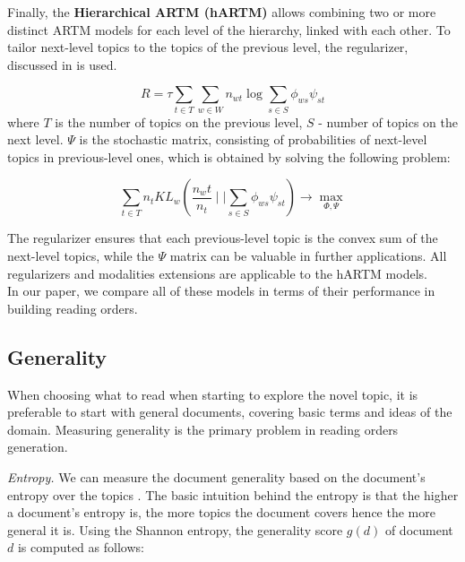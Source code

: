 \documentclass[12pt,twoside]{article}
\begin{document}
        Finally, the \textbf{Hierarchical ARTM (hARTM)} allows combining two or more distinct ARTM models for each level of the hierarchy, linked with each other. To tailor next-level topics to the topics of the previous level, the regularizer, discussed in \cite{chirkova16hier} is used. 
        
        \begin{equation}
            R = \tau \sum\limits_{t \in T}\sum\limits_{w \in W} n_{wt} \log \sum\limits_{s \in S} \phi_{ws}\psi_{st}
        \end{equation}
        where $T$ is the number of topics on the previous level, $S$ - number of topics on the next level. $\Psi$ is the stochastic matrix, consisting of probabilities of next-level topics in previous-level ones, which is obtained by solving the following problem:  
    
        \begin{equation}
            \sum\limits_{t \in T} n_t KL_w\left( \frac{n_wt}{n_t} \mid\mid \sum\limits_{s \in S} \phi_{ws} \psi_{st} \right) \rightarrow \max_{\Phi, \Psi}
        \end{equation}
        
        The regularizer ensures that each previous-level topic is the convex sum of the next-level topics, while the $\Psi$ matrix can be valuable in further applications. All regularizers and modalities extensions are applicable to the hARTM models. \\
        
        In our paper, we compare all of these models in terms of their performance in building reading orders.
	
	\subsection{Generality}
	
	When choosing what to read when starting to explore the novel topic, it is preferable to start with general documents, covering basic terms and ideas of the domain. Measuring generality is the primary problem in reading orders generation.
	
	\textit{Entropy.} We can measure the document generality based on the document’s entropy over the topics \cite{conf/icde/KoutrikaLS15}. The basic intuition behind the entropy is that the higher a document’s entropy is, the more topics the document covers hence the more general it is. Using the Shannon entropy, the generality score $g(d)$ of document $d$ is computed as follows:
	
\end{document}
